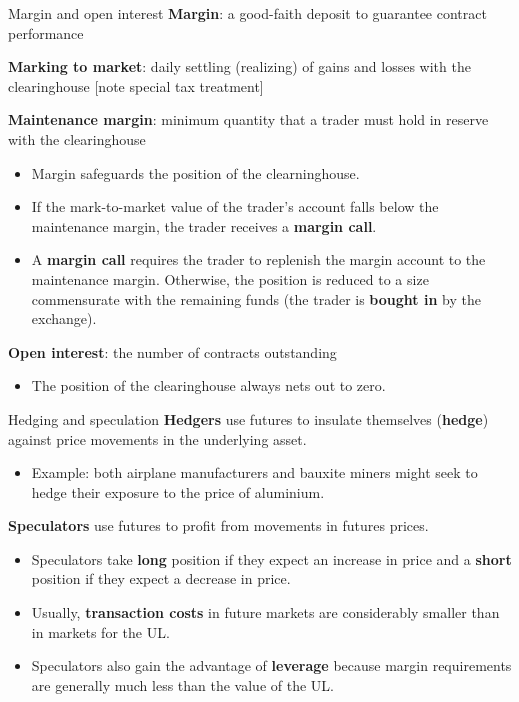 \documentclass[
  ignorenonframetext,
  aspectratio=169]{beamer}
\providecommand{\tightlist}{%
  \setlength{\itemsep}{0pt}\setlength{\parskip}{0pt}}
\begin{document}
\begin{frame}{Margin and open interest}
\protect\hypertarget{margin-and-open-interest}{}
\textbf{Margin}: a good-faith deposit to guarantee contract performance

\textbf{Marking to market}: daily settling (realizing) of gains and
losses with the clearinghouse {[}note special tax treatment{]}

\textbf{Maintenance margin}: minimum quantity that a trader must hold in
reserve with the clearinghouse

\begin{itemize}
\tightlist
\item
  Margin safeguards the position of the clearninghouse.
\item
  If the mark-to-market value of the trader's account falls below the
  maintenance margin, the trader receives a \textbf{margin call}.
\item
  A \textbf{margin call} requires the trader to replenish the margin
  account to the maintenance margin. Otherwise, the position is reduced
  to a size commensurate with the remaining funds (the trader is
  \textbf{bought in} by the exchange).
\end{itemize}

\textbf{Open interest}: the number of contracts outstanding

\begin{itemize}
\tightlist
\item
  The position of the clearinghouse always nets out to zero.
\end{itemize}
\end{frame}

\begin{frame}{Hedging and speculation}
\protect\hypertarget{hedging-and-speculation}{}
\textbf{Hedgers} use futures to insulate themselves (\textbf{hedge})
against price movements in the underlying asset.

\begin{itemize}
\tightlist
\item
  Example: both airplane manufacturers and bauxite miners might seek to
  hedge their exposure to the price of aluminium.
\end{itemize}

\textbf{Speculators} use futures to profit from movements in futures
prices.

\begin{itemize}
\tightlist
\item
  Speculators take \textbf{long} position if they expect an increase in
  price and a \textbf{short} position if they expect a decrease in
  price.
\item
  Usually, \textbf{transaction costs} in future markets are considerably
  smaller than in markets for the UL.
\item
  Speculators also gain the advantage of \textbf{leverage} because
  margin requirements are generally much less than the value of the UL.
\end{itemize}
\end{frame}
\end{document}
